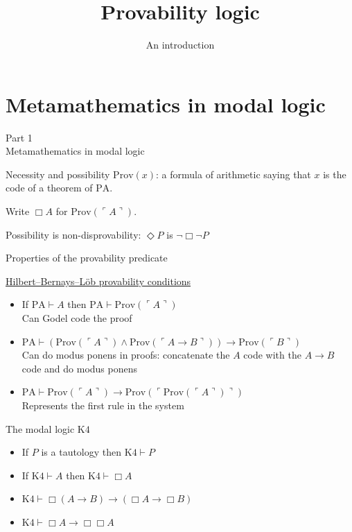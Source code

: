 \documentclass[
  ignorenonframetext,
]{beamer}
\title{\texorpdfstring{Provability logic}{Provability logic}}
\subtitle{\texorpdfstring{An introduction}{An introduction}}
\author{}
\date{}
\providecommand{\tightlist}{%
  \setlength{\itemsep}{0pt}\setlength{\parskip}{0pt}}
\newcommand{\Prov}{\mathrm{Prov}}
\newcommand{\PA}{\mathrm{PA}}
\newcommand{\KF}{\mathrm{K4}}
\newcommand{\gn}[1]{\ulcorner #1 \urcorner}
\begin{document}
\frame{\titlepage}


\section{Metamathematics in modal
logic}\label{metamathematics-in-modal-logic}

\begin{frame}{}
\protect{}\label{section}
\centering\Large Part 1\\[1ex] Metamathematics in modal logic
\end{frame}

\begin{frame}{Necessity and possibility}
\protect{}\label{necessity-and-possibility}
\(\Prov(x)\): a formula of arithmetic saying that \(x\) is the code of a
theorem of \(\PA\).

Write \(\Box A\) for \(\Prov(\gn{A})\).

Possibility is non-disprovability: \(\Diamond P\) is
\(\lnot\Box\lnot P\)
\end{frame}

\begin{frame}{Properties of the provability predicate}
\protect{}\label{properties-of-the-provability-predicate}
\bigskip

\href{https://en.wikipedia.org/wiki/Hilbert\%E2\%80\%93Bernays\%E2\%80\%93L\%C3\%B6b_provability_conditions\#The_conditions}{Hilbert--Bernays--Löb
provability conditions}

\bigskip

\begin{itemize}
\tightlist
\item
  If \(\PA \vdash A\) then \(\PA \vdash \Prov(\gn{A})\)\\
  Can Godel code the proof
\item
  \(\PA \vdash  (\Prov(\gn{A}) \land \Prov(\gn{A \to B})) \to \Prov(\gn{B})\)\\
  Can do modus ponens in proofs: concatenate the \(A\) code with the
  \(A \to B\) code and do modus ponens
\item
  \(\PA \vdash \Prov(\gn{A}) \to \Prov(\gn{\Prov(\gn{A})})\)\\
  Represents the first rule in the system
\end{itemize}
\end{frame}

\begin{frame}{The modal logic \(\KF\)}
\protect{}\label{the-modal-logic-kf}
\bigskip

\begin{itemize}
\tightlist
\item
  If \(P\) is a tautology then \(\KF \vdash P\)
\item
  If \(\KF \vdash A\) then \(\KF \vdash \Box A\)
\item
  \(\KF \vdash \Box(A \to B) \to (\Box A \to \Box B)\)
\item
  \(\KF \vdash \Box A \to \Box\Box A\)
\end{itemize}
\end{frame}
\end{document}
